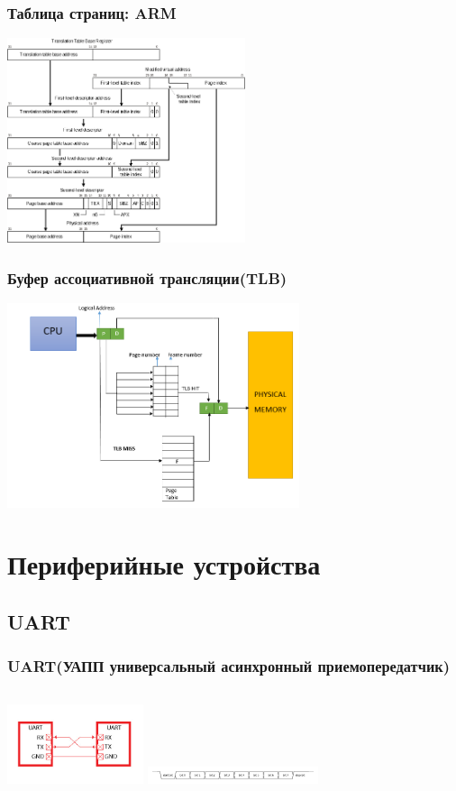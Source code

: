 \begin{frame}
  \frametitle{Таблица страниц: ARM}
  \begin{center}
    \includegraphics[height=6cm]{large_page_table_walk_armv6_format.png}
  \end{center}
\end{frame}

\begin{frame}
  \frametitle{Буфер ассоциативной трансляции(TLB)}
  \begin{center}
    \includegraphics[height=6cm]{Translation_Lookaside_Buffer.png}
  \end{center}
\end{frame}

\section{Периферийные устройства}
\subsection{UART}
\begin{frame}
  \frametitle{UART(УАПП универсальный асинхронный приемопередатчик)}
  \begin{columns}
    \column{4cm}
    \includegraphics[width=4cm]{uart_bus.jpg}
    \column{4.5cm}
    \includegraphics[width=5cm]{UART_timing_diagram.png}
  \end{columns}
\end{frame}

